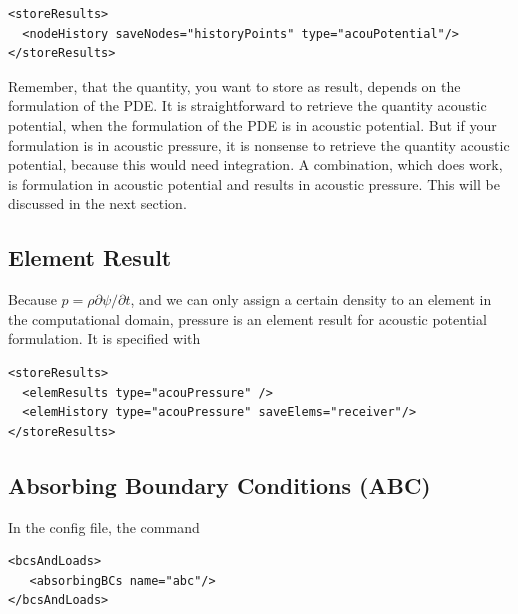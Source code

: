 \begin{verbatim}    
<storeResults>
  <nodeHistory saveNodes="historyPoints" type="acouPotential"/>
</storeResults>
\end{verbatim}

Remember, that the quantity, you want to store as result, depends on the formulation of the PDE. It is straightforward to retrieve the quantity acoustic potential, when the formulation of the PDE is in acoustic potential. But if your formulation is in acoustic pressure, it is nonsense to retrieve the quantity acoustic potential, because this would need integration. A combination, which does work, is formulation in acoustic potential and results in acoustic pressure. This will be discussed in the next section.

\subsection{Element Result}

Because $p = \rho \partial \psi / \partial t$, and we can only assign a certain density to an element in the computational domain, pressure is an element result for acoustic potential formulation. It is specified with

\begin{verbatim}
<storeResults>
  <elemResults type="acouPressure" />
  <elemHistory type="acouPressure" saveElems="receiver"/>
</storeResults>
\end{verbatim}



\subsection{Absorbing Boundary Conditions (ABC)} 
In the config file, the command

\begin{verbatim}    
<bcsAndLoads>  
   <absorbingBCs name="abc"/>
</bcsAndLoads>
\end{verbatim}
      
